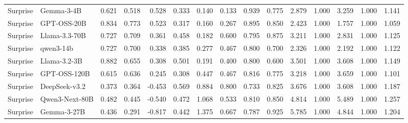 \begin{table}[t]
{\begin{tabular}{llrrrrrrrrrrrrr}
Surprise & Gemma-3-4B & 0.621 & 0.518 & 0.528 & 0.333 & 0.140 & 0.133 & 0.939 & 0.775 & 2.879 & 1.000 & 3.259 & 1.000 & 1.141 \\
Surprise & GPT-OSS-20B & 0.834 & 0.773 & 0.523 & 0.317 & 0.160 & 0.267 & 0.895 & 0.850 & 2.423 & 1.000 & 1.757 & 1.000 & 1.059 \\
Surprise & Llama-3.3-70B & 0.727 & 0.709 & 0.361 & 0.458 & 0.182 & 0.600 & 0.795 & 0.875 & 3.211 & 1.000 & 2.831 & 1.000 & 1.125 \\
Surprise & qwen3-14b & 0.727 & 0.700 & 0.338 & 0.385 & 0.277 & 0.467 & 0.800 & 0.700 & 2.326 & 1.000 & 2.192 & 1.000 & 1.122 \\
Surprise & Llama-3.2-3B & 0.882 & 0.655 & 0.308 & 0.501 & 0.191 & 0.400 & 0.800 & 0.600 & 3.501 & 1.000 & 3.608 & 1.000 & 1.149 \\
Surprise & GPT-OSS-120B & 0.615 & 0.636 & 0.245 & 0.308 & 0.447 & 0.467 & 0.816 & 0.775 & 3.218 & 1.000 & 3.659 & 1.000 & 1.101 \\
Surprise & DeepSeek-v3.2 & 0.373 & 0.364 & -0.453 & 0.569 & 0.884 & 0.800 & 0.733 & 0.825 & 3.676 & 1.000 & 3.608 & 1.000 & 1.187 \\
Surprise & Qwen3-Next-80B & 0.482 & 0.445 & -0.540 & 0.472 & 1.068 & 0.533 & 0.810 & 0.850 & 4.814 & 1.000 & 5.489 & 1.000 & 1.257 \\
Surprise & Gemma-3-27B & 0.436 & 0.291 & -0.817 & 0.442 & 1.375 & 0.667 & 0.787 & 0.925 & 5.785 & 1.000 & 4.844 & 1.000 & 1.204 \\
\bottomrule
\end{tabular}
}
\end{table}
